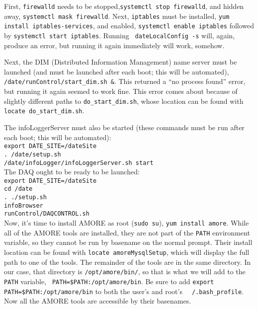 \documentclass[12pt]{article}
\begin{document}
\qq First, {\tt firewalld} needs to be stopped,{\tt systemctl stop firewalld},
and hidden away, {\tt systemctl mask firewalld}. Next, {\tt iptables} must be
installed, {\tt yum install iptables-services}, and enabled, {\tt systemctl
  enable iptables} followed by {\tt systemctl start iptables}. Running {\tt
  dateLocalConfig -s} will, again, produce an error, but running it again
immediately will work, somehow.

\qq Next, the DIM (Distributed Information Management) name server must be
launched (and must be launched after each boot; this will be automated), {\tt
  /date/runControl/start\_dim.sh \&}. This returned a ``no process found'' error,
but running it again seemed to work fine. This error comes about because of
slightly different paths to {\tt do\_start\_dim.sh}, whose location can be found
with {\tt locate do\_start\_dim.sh}.

\qq The infoLoggerServer must also be started (these commands must be run after
each boot; this will be automated):\\
{\tt export DATE\_SITE=/dateSite} \\
{\tt . /date/setup.sh} \\
{\tt /date/infoLogger/infoLoggerServer.sh start} \\

\qq The DAQ ought to be ready to be launched:\\
{\tt export DATE\_SITE=/dateSite}\\
{\tt cd /date} \\
{\tt . ./setup.sh}\\
{\tt infoBrowser}\\
{\tt runControl/DAQCONTROL.sh}\\

\qq Now, it's time to install AMORE as root ({\tt sudo su}), {\tt yum install
  amore}. While all of the AMORE tools are installed, they are not part of the
{\tt PATH} environment variable, so they cannot be run by basename on the normal
prompt. Their install location can be found with {\tt locate amoreMysqlSetup},
which will display the full path to one of the tools. The remainder of the tools
are in the same directory. In our case, that directory is {\tt /opt/amore/bin/},
so that is what we will add to the {\tt PATH} variable, {\tt
  PATH=\$PATH:/opt/amore/bin}. Be sure to add {\tt export
  PATH=\$PATH:/opt/amore/bin} to both the user's and root's {\tt
  ~/.bash\_profile}. Now all the AMORE tools are accessible by their
basenames.
\end{document}
